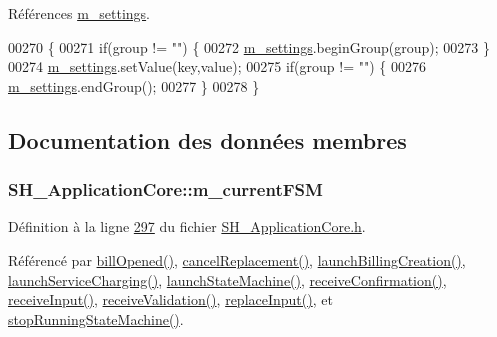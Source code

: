 Références \hyperlink{classSH__ApplicationCore_a26684dd6552b4aea5860de641a326774}{m\-\_\-settings}.


\begin{DoxyCode}
00270 \{
00271     \textcolor{keywordflow}{if}(group != \textcolor{stringliteral}{""}) \{
00272         \hyperlink{classSH__ApplicationCore_a26684dd6552b4aea5860de641a326774}{m\_settings}.beginGroup(group);
00273     \}
00274     \hyperlink{classSH__ApplicationCore_a26684dd6552b4aea5860de641a326774}{m\_settings}.setValue(key,value);
00275     \textcolor{keywordflow}{if}(group != \textcolor{stringliteral}{""}) \{
00276         \hyperlink{classSH__ApplicationCore_a26684dd6552b4aea5860de641a326774}{m\_settings}.endGroup();
00277     \}
00278 \}
\end{DoxyCode}


\subsection{Documentation des données membres}
\hypertarget{classSH__ApplicationCore_a8e550daf4a5d49d88714b716953e4957}{
\subsubsection[{m\-\_\-current\-F\-S\-M}]{\setlength{\rightskip}{0pt plus 5cm}S\-H\-\_\-\-Application\-Core\-::m\-\_\-current\-F\-S\-M\hspace{0.3cm}{\ttfamily [private]}}}\label{classSH__ApplicationCore_a8e550daf4a5d49d88714b716953e4957}


Définition à la ligne \hyperlink{SH__ApplicationCore_8h_source_l00297}{297} du fichier \hyperlink{SH__ApplicationCore_8h_source}{S\-H\-\_\-\-Application\-Core.\-h}.



Référencé par \hyperlink{classSH__ApplicationCore_a111103d68e1a0f1fdaeef7cd85333896}{bill\-Opened()}, \hyperlink{classSH__ApplicationCore_a9976ff6a371d6fe4c97cc37692584ff1}{cancel\-Replacement()}, \hyperlink{classSH__ApplicationCore_a1e718a7a101e53e1cfcf8160104d4ba8}{launch\-Billing\-Creation()}, \hyperlink{classSH__ApplicationCore_a74af071d9fefb1f0c3373e6501d04d62}{launch\-Service\-Charging()}, \hyperlink{classSH__ApplicationCore_ac0d2178f5351e1eb12ff5d6c6afb83d6}{launch\-State\-Machine()}, \hyperlink{classSH__ApplicationCore_a15cce25dbf982bc8fc391ddfb4d1fd24}{receive\-Confirmation()}, \hyperlink{classSH__ApplicationCore_a2191031eaee203587c1897791ddefbc4}{receive\-Input()}, \hyperlink{classSH__ApplicationCore_a6d40bb4cca2fe9e091dd369518d08ce0}{receive\-Validation()}, \hyperlink{classSH__ApplicationCore_a82123e26fba2d137cbf356b4aaf2078e}{replace\-Input()}, et \hyperlink{classSH__ApplicationCore_a8015a273eaedf42926f20a7858933683}{stop\-Running\-State\-Machine()}.

